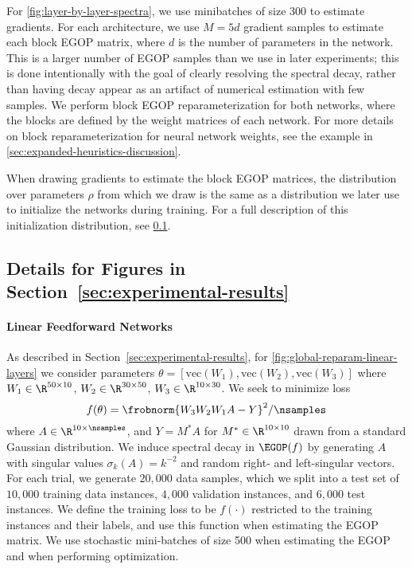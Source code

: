 For \cref{fig:layer-by-layer-spectra}, we use minibatches of size 300 to estimate gradients. For each architecture, we use $M = 5d$ gradient samples to estimate each block EGOP matrix, where $d$ is the number of parameters in the network. This is a larger number of EGOP samples than we use in later experiments; this is done intentionally with the goal of clearly resolving the spectral decay, rather than having decay appear as an artifact of numerical estimation with few samples. We perform block EGOP reparameterization for both networks, where the blocks are defined by the weight matrices of each network. For more details on block reparameterization for neural network weights, see the example in \cref{sec:expanded-heuristics-discussion}.

When drawing gradients to estimate the block EGOP matrices, the distribution over parameters $\rho$ from which we draw is the same as a distribution we later use to initialize the networks during training. For a full description of this initialization distribution, see \cref{ssec:details-for-main-body-experimental-results}.

\subsection{Details for Figures in Section~\ref{sec:experimental-results}}\label{ssec:details-for-main-body-experimental-results}

\paragraph{Linear Feedforward Networks} As described in Section~\ref{sec:experimental-results}, for \cref{fig:global-reparam-linear-layers} we consider parameters $\theta = [\textrm{vec}(W_1), \textrm{vec}(W_2), \textrm{vec}(W_3)]$ where $W_1 \in \R^{50\times 10}$, $W_2 \in \R^{30\times 50}$, $W_3 \in \R^{10\times 30}$. We seek to minimize loss
\[
    f(\theta) = \frobnorm{W_3 W_2 W_1 A - Y}^2 /\nsamples
\]
where $A\in \R^{10\times \nsamples}$, and $Y = M^* A$ for $M^*\in \R^{10\times 10}$ drawn from a standard Gaussian distribution. We induce spectral decay in $\EGOP(f)$ by generating $A$ with singular values $\sigma_k(A) = k^{-2}$ and random right- and left-singular vectors. For each trial, we generate $20,000$ data samples, which we split into a test set of $10,000$ training data instances, $4,000$ validation instances, and $6,000$ test instances. We define the training loss to be $f(\cdot)$ restricted to the training instances and their labels, and use this function when estimating the EGOP matrix. We use stochastic mini-batches of size 500 when estimating the EGOP and when performing optimization.

